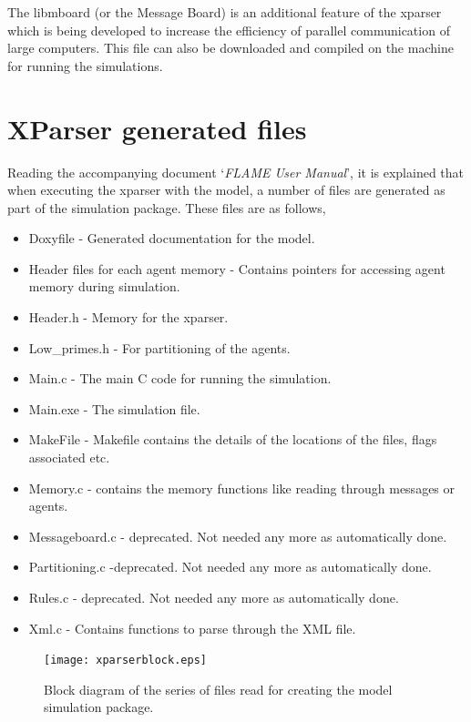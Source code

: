 \documentclass[a4paper,11pt]{article}
\begin{document}
The libmboard (or the Message Board) is an additional feature of the
xparser which is being developed to increase the efficiency of
parallel communication of large computers. This file can also be
downloaded and compiled on the machine for running the simulations.

\section{XParser generated files}
Reading the accompanying document `\emph{FLAME User Manual}', it is
explained that when executing the xparser with the model, a number
of files are generated as part of the simulation package. These
files are as follows,

\begin{itemize}
\item Doxyfile - Generated documentation for the model.
\item Header files for each agent memory - Contains pointers for accessing agent memory during simulation.
\item Header.h  - Memory for the xparser.
\item Low\_primes.h - For partitioning of the agents.
\item Main.c - The main C code for running the simulation.
\item Main.exe - The simulation file.
\item MakeFile - Makefile contains the details of the locations of the files, flags associated etc.
\item Memory.c - contains the memory functions like reading through messages or agents.
\item Messageboard.c - deprecated. Not needed any more as
automatically done.
\item Partitioning.c -deprecated. Not needed any more as
automatically done.
\item Rules.c - deprecated. Not needed any more as
automatically done.
\item Xml.c - Contains functions to parse through the XML file.
\end{itemize}



\begin{figure}[!htb]
\begin{center}
  \texttt{[image: xparserblock.eps]}
  \caption{Block diagram of the series of files read for
creating the model simulation package.}
  \label{fig:xparserblock}
  \end{center}
\end{figure}
\end{document}
